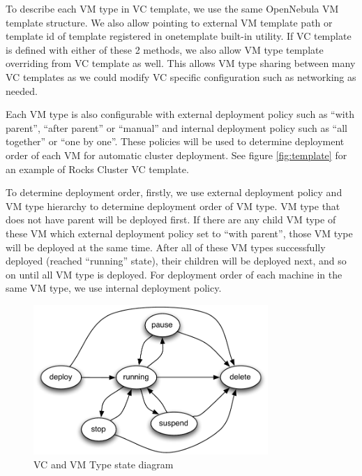 \documentclass[conference]{IEEEtran}
\begin{document}
To describe each VM type in VC template, we use the same OpenNebula VM template structure.
We also allow pointing to external VM template path or template id of template registered in onetemplate built-in utility.
If VC template is defined with either of these 2 methods, we also allow VM type template overriding from VC template as well.
This allows VM type sharing between many VC templates as we could modify VC specific configuration such as networking as needed.

Each VM type is also configurable with external deployment policy such as ``with parent'', ``after parent'' or ``manual'' and internal deployment policy such as ``all together'' or ``one by one''.
These policies will be used to determine deployment order of each VM for automatic cluster deployment.
See figure \ref{fig:template} for an example of Rocks Cluster VC template.

To determine deployment order, firstly, we use external deployment policy and VM type hierarchy to determine deployment order of VM type.
VM type that does not have parent will be deployed first.
If there are any child VM type of these VM which external deployment policy set to ``with parent'', those VM type will be deployed at the same time.
After all of these VM types successfully deployed (reached ``running'' state), their children will be deployed next, and so on until all VM type is deployed.
For deployment order of each machine in the same VM type, we use internal deployment policy.

\begin{figure}[!t]
\centering
\includegraphics[width=3.5in]{state}
\caption{VC and VM Type state diagram}
\label{fig:state}
\end{figure}
\end{document}
